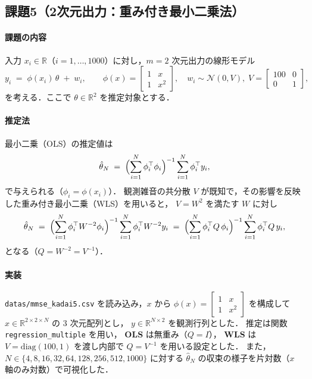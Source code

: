\subsection{課題5（2次元出力：重み付き最小二乗法）}

\paragraph{課題の内容}
入力 $x_i \in \mathbb{R}$（$i=1,\dots,1000$）に対し，$m=2$ 次元出力の線形モデル
\[
  y_i \;=\; \phi(x_i)\,\theta \;+\; w_i,\qquad
  \phi(x) = 
  \begin{bmatrix}
    1 & x\\
    1 & x^2
  \end{bmatrix},
  \quad
  w_i \sim \mathcal{N}(0,V),\;
  V=\begin{bmatrix}100&0\\0&1\end{bmatrix},
\]
を考える．ここで $\theta\in\mathbb{R}^2$ を推定対象とする．

\paragraph{推定法}
最小二乗（OLS）の推定値は
\[
  \hat{\theta}_N \;=\;
  \Bigl(\sum_{i=1}^N \phi_i^\top \phi_i \Bigr)^{-1}
  \sum_{i=1}^N \phi_i^\top y_i,
\]
で与えられる（$\phi_i=\phi(x_i)$）．
観測雑音の共分散 $V$ が既知で，その影響を反映した重み付き最小二乗（WLS）を用いると，
$V=W^2$ を満たす $W$ に対し
\[
  \hat{\theta}_N \;=\;
  \Bigl(\sum_{i=1}^N \phi_i^\top W^{-2}\phi_i \Bigr)^{-1}
  \sum_{i=1}^N \phi_i^\top W^{-2} y_i
  \;=\;
  \Bigl(\sum_{i=1}^N \phi_i^\top Q\,\phi_i \Bigr)^{-1}
  \sum_{i=1}^N \phi_i^\top Q\, y_i,
\]
となる（$Q=W^{-2}=V^{-1}$）．

\paragraph{実装}
\texttt{datas/mmse\_kadai5.csv} を読み込み，$x$ から
\(
\phi(x)=\begin{bmatrix}1&x\\1&x^2\end{bmatrix}
\)
を構成して $x\in\mathbb{R}^{2\times 2\times N}$ の 3 次元配列とし，
$y\in\mathbb{R}^{N\times 2}$ を観測行列とした．
推定は関数 \texttt{regression\_multiple} を用い，
\textbf{OLS} は無重み（$Q=I$），
\textbf{WLS} は $V=\mathrm{diag}(100,1)$ を渡し内部で $Q=V^{-1}$ を用いる設定とした．
また，$N\in\{4,8,16,32,64,128,256,512,1000\}$ に対する
$\hat{\theta}_N$ の収束の様子を片対数（$x$ 軸のみ対数）で可視化した．

